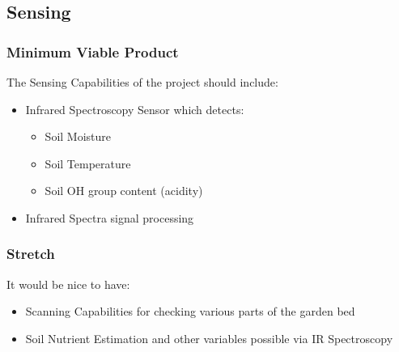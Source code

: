 \subsection{Sensing}
\subsubsection{Minimum Viable Product}
The Sensing Capabilities of the project should include:
\begin{itemize}
    \item Infrared Spectroscopy Sensor which detects:
    \begin{itemize}
            \item Soil Moisture
            \item Soil Temperature
            \item Soil OH group content (acidity)
    \end{itemize}
    \item Infrared Spectra signal processing
\end{itemize}
\subsubsection{Stretch}
It would be nice to have:
\begin{itemize}
    \item Scanning Capabilities for checking various parts of the garden bed
    \item Soil Nutrient Estimation and other variables possible via IR Spectroscopy
\end{itemize}
